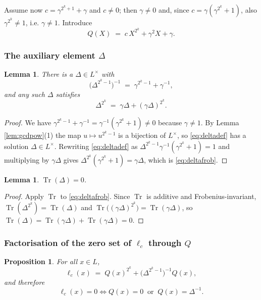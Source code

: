 \documentclass[11pt,a4paper]{article}
\newtheorem{proposition}[theorem]{Proposition}
\newtheorem{lemma}[theorem]{Lemma}
\theoremstyle{definition}
\newcommand{\Tr}{\operatorname{Tr}}
\begin{document}
Assume now $c=\gamma^{2^{k}+1}+\gamma$ and $c\neq0$; then $\gamma\neq0$ and, since
$c=\gamma(\gamma^{2^{k}}+1)$, also $\gamma^{2^{k}}\neq1$, i.e. $\gamma\neq1$.
Introduce
\[
  Q(X)\;=\;c\,X^{2^{k}}+\gamma^{2}X+\gamma .
\]

\subsubsection{The auxiliary element $\Delta$}

\begin{lemma}\label{lem:delta}
There is a $\Delta\in L^{\times}$ with
\begin{equation}\label{eq:deltadef}
  \bigl(\Delta^{2^{k}-1}\bigr)^{-1}\;=\;\gamma^{2^{k}-1}+\gamma^{-1},
\end{equation}
and any such $\Delta$ satisfies
\begin{equation}\label{eq:deltafrob}
  \Delta^{2^{k}}\;=\;\gamma\Delta+(\gamma\Delta)^{2^{k}} .
\end{equation}
\end{lemma}

\begin{proof}
We have $\gamma^{2^{k}-1}+\gamma^{-1}=\gamma^{-1}(\gamma^{2^{k}}+1)\neq0$ because
$\gamma\ne 1$.  By Lemma \ref{lem:gcdpow}(1) the map $u\mapsto u^{2^{k}-1}$ is a
bijection of $L^{\times}$, so \eqref{eq:deltadef} has a solution
$\Delta\in L^{\times}$.  Rewriting \eqref{eq:deltadef} as
$\Delta^{2^{k}-1}\gamma^{-1}(\gamma^{2^{k}}+1)=1$ and multiplying by
$\gamma\Delta$ gives $\Delta^{2^{k}}(\gamma^{2^{k}}+1)=\gamma\Delta$, which is
\eqref{eq:deltafrob}.
\end{proof}

\begin{lemma}\label{lem:tracedelta}
$\Tr(\Delta)=0$.
\end{lemma}

\begin{proof}
Apply $\Tr$ to \eqref{eq:deltafrob}.  Since $\Tr$ is additive and
Frobenius-invariant, $\Tr(\Delta^{2^{k}})=\Tr(\Delta)$ and
$\Tr\bigl((\gamma\Delta)^{2^{k}}\bigr)=\Tr(\gamma\Delta)$, so
$\Tr(\Delta)=\Tr(\gamma\Delta)+\Tr(\gamma\Delta)=0$.
\end{proof}

\subsubsection{Factorisation of the zero set of $\ell_c$ through $Q$}

\begin{proposition}\label{prop:ellQ}
For all $x\in L$,
\[
  \ell_c(x)\;=\;Q(x)^{2^{k}}+\bigl(\Delta^{2^{k}-1}\bigr)^{-1}Q(x),
\]
and therefore
\begin{equation}\label{eq:F}
  \ell_c(x)=0\iff Q(x)=0\ \text{ or }\ Q(x)=\Delta^{-1}. \tag{F}
\end{equation}
\end{proposition}
\end{document}
